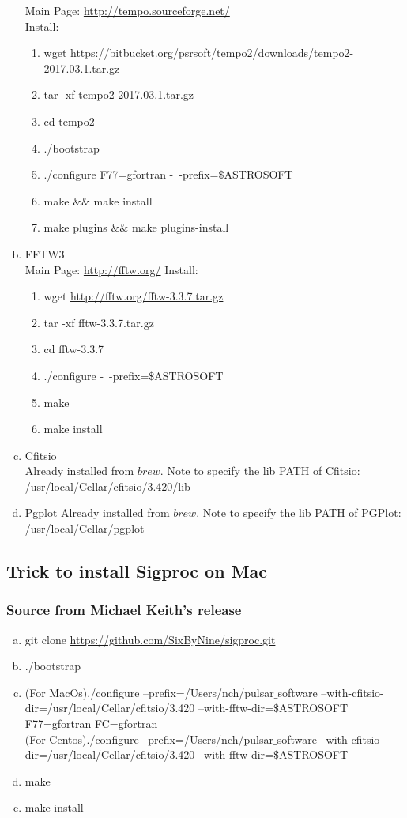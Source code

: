 \documentclass{article}
\begin{document}
\begin{enumerate}[a.]
	Main Page: \url{http://tempo.sourceforge.net/} \\
	Install:
	\begin{enumerate}[1):]
	\item wget \url{https://bitbucket.org/psrsoft/tempo2/downloads/tempo2-2017.03.1.tar.gz}
	\item tar -xf tempo2-2017.03.1.tar.gz
	\item cd tempo2
	\item ./bootstrap
	\item ./configure F77=gfortran -~-prefix=$\$$ASTROSOFT
	\item make $\&\&$ make install
	\item make plugins $\&\&$ make plugins-install
	\end{enumerate}	
\item FFTW3\\
	Main Page: \url{http://fftw.org/}
	Install:
	\begin{enumerate}[1):]
	\item wget \url{http://fftw.org/fftw-3.3.7.tar.gz}
	\item tar -xf fftw-3.3.7.tar.gz
	\item cd fftw-3.3.7
	\item ./configure  -~-prefix=$\$$ASTROSOFT
	\item make
	\item make install
	\end{enumerate}		
\item Cfitsio \\
	Already installed from $brew$. Note to specify the lib PATH of Cfitsio:\\
	/usr/local/Cellar/cfitsio/3.420/lib
\item Pgplot
	Already installed from $brew$. Note to specify the lib PATH of PGPlot:\\
	/usr/local/Cellar/pgplot
\end{enumerate}

\subsection{Trick to install Sigproc on Mac}
\subsubsection{Source from Michael Keith's release}
\begin{enumerate}[a):]
\item git clone \url{https://github.com/SixByNine/sigproc.git}
\item ./bootstrap
\item (For MacOs)./configure --prefix=/Users/nch/pulsar$\_$software --with-cfitsio-dir=/usr/local/Cellar/cfitsio/3.420 --with-fftw-dir=$\$$ASTROSOFT F77=gfortran FC=gfortran \\

 (For Centos)./configure --prefix=/Users/nch/pulsar$\_$software --with-cfitsio-dir=/usr/local/Cellar/cfitsio/3.420 --with-fftw-dir=$\$$ASTROSOFT 
\item make
\item make install
\end{enumerate}
\end{document}

